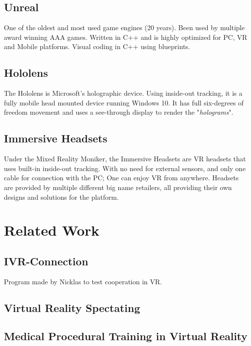         \subsection{Unreal}
        One of the oldest and most used game engines (20 years). Been used by multiple award winning AAA games. Written in C++ and is highly optimized for PC, VR and Mobile platforms.
        Visual coding in C++ using blueprints.
    
        \subsection{Hololens}
        The Hololens is Microsoft's holographic device. Using inside-out tracking, it is a fully mobile head mounted device running Windows 10. It has full six-degrees of freedom movement and uses a see-through display to render the "\emph{holograms}".
    
        \subsection{Immersive Headsets}
        Under the Mixed Reality Moniker, the Immersive Headsets are VR headsets that uses built-in inside-out tracking. With no need for external sensors, and only one cable for connection with the PC; One can enjoy VR from anywhere. Headsets are provided by multiple different big name retailers, all providing their own designs and solutions for the platform.
    
    \section{Related Work}
        
        \subsection{IVR-Connection}
        Program made by Nicklas to test cooperation in VR.
        
        \subsection{Virtual Reality Spectating}
        
        \subsection{Medical Procedural Training in Virtual Reality}
